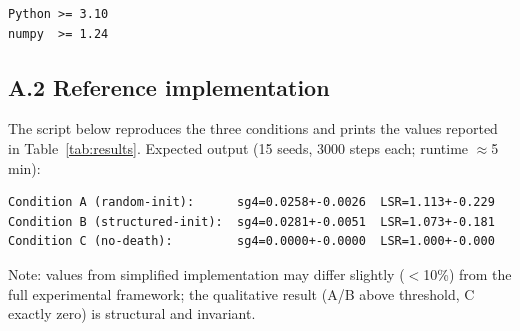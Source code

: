 \documentclass[11pt,twocolumn]{article}
\begin{document}
\begin{verbatim}
Python >= 3.10
numpy  >= 1.24
\end{verbatim}

\subsection*{A.2 Reference implementation}

The script below reproduces the three conditions and prints the
values reported in Table~\ref{tab:results}.
Expected output (15 seeds, 3000 steps each; runtime $\approx$5\,min):
\begin{verbatim}
Condition A (random-init):      sg4=0.0258+-0.0026  LSR=1.113+-0.229
Condition B (structured-init):  sg4=0.0281+-0.0051  LSR=1.073+-0.181
Condition C (no-death):         sg4=0.0000+-0.0000  LSR=1.000+-0.000
\end{verbatim}
Note: values from simplified implementation may differ slightly ($<$10\%)
from the full experimental framework; the qualitative result (A/B above
threshold, C exactly zero) is structural and invariant.
\end{document}
